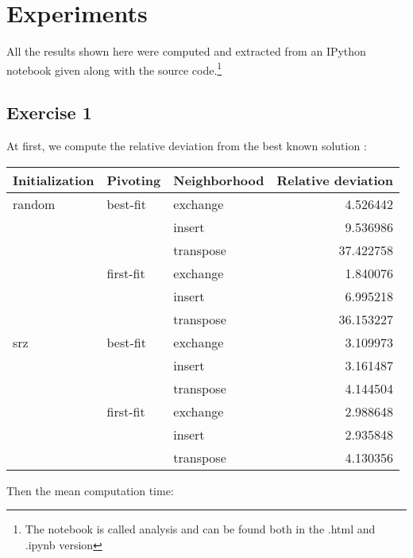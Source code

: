 \documentclass[a4paper]{article}
\begin{document}
\section{Experiments}

All the results shown here were computed and extracted from an IPython notebook
given along with the source code.\footnote{The notebook is called analysis and can be found both in the .html and .ipynb version}

\subsection{Exercise 1}

At first, we compute the relative deviation from the best known solution :

\begin{center}
\begin{tabular}{lllr}
\toprule
Initialization & Pivoting & Neighborhood & Relative deviation \\
\midrule
random & best-fit & exchange &       4.526442 \\
       &      & insert &       9.536986 \\
       &      & transpose &      37.422758 \\
       & first-fit & exchange &       1.840076 \\
       &      & insert &       6.995218 \\
       &      & transpose &      36.153227 \\
srz & best-fit & exchange &       3.109973 \\
       &      & insert &       3.161487 \\
       &      & transpose &       4.144504 \\
       & first-fit & exchange &       2.988648 \\
       &      & insert &       2.935848 \\
       &      & transpose &       4.130356 \\
\bottomrule
\end{tabular}
\end{center}

Then the mean computation time:
\end{document}
